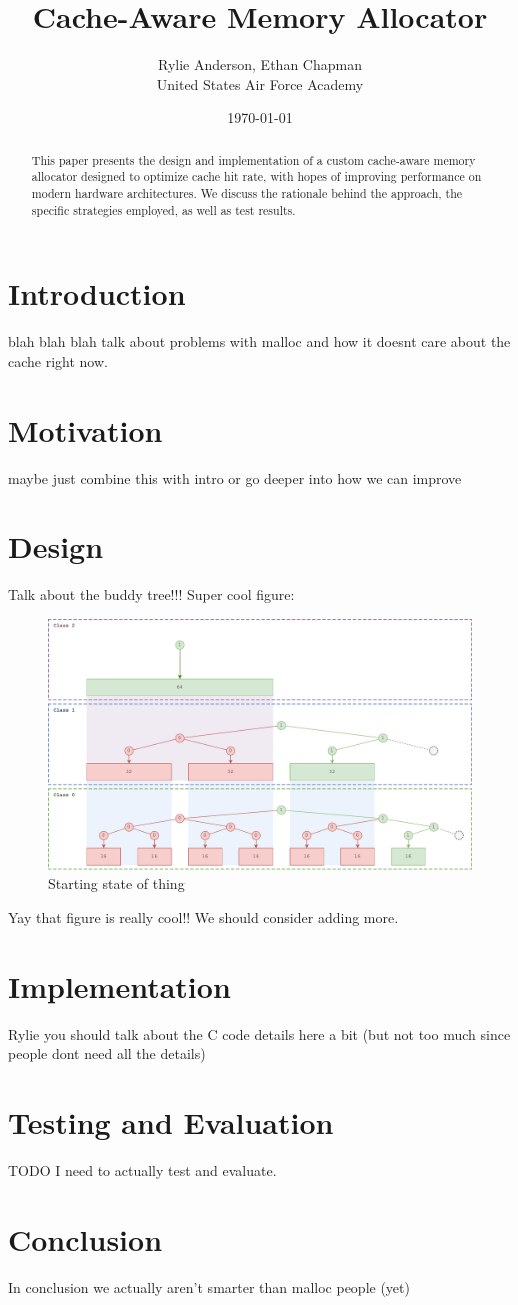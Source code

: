 \documentclass[11pt]{article}
\title{Cache-Aware Memory Allocator}
\author{Rylie Anderson, Ethan Chapman \\ United States Air Force Academy}
\date{\today}
\begin{document}
\maketitle

\begin{abstract}
This paper presents the design and implementation of a custom cache-aware memory allocator designed to optimize cache hit rate, with hopes of improving performance on modern hardware architectures. We discuss the rationale behind the approach, the specific strategies employed, as well as test results.
\end{abstract}

\section{Introduction}
blah blah blah talk about problems with malloc and how it doesnt care about the cache right now.

\section{Motivation}
maybe just combine this with intro or go deeper into how we can improve

\section{Design}
Talk about the buddy tree!!! Super cool figure:

\begin{figure}[ht]
\centering
\label{fig:tree1}
\includegraphics[width=0.5\columnwidth]{tree}
\caption{Starting state of thing}
\end{figure}

Yay that figure is really cool!! We should consider adding more.

\section{Implementation}
Rylie you should talk about the C code details here a bit (but not too much since people dont need all the details)

\section{Testing and Evaluation}
TODO I need to actually test and evaluate.

\section{Conclusion}
In conclusion we actually aren't smarter than malloc people (yet)



\end{document}
